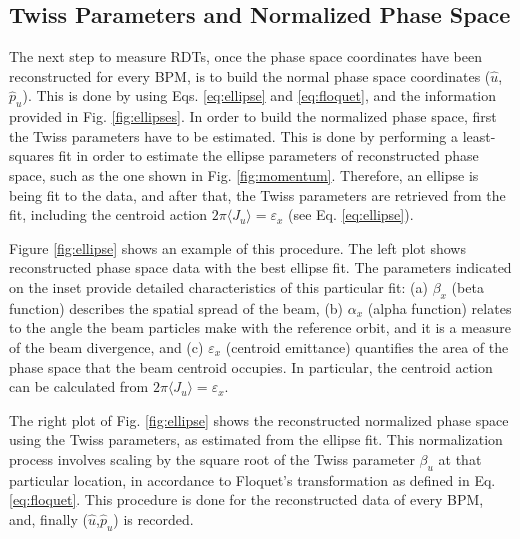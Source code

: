 \subsection{Twiss Parameters and Normalized Phase Space}

The next step to measure RDTs, once the phase space coordinates have been reconstructed for every BPM, is to build the normal phase space coordinates ($\hat{u}$,$\hat{p}_u$). This is done by using Eqs. \ref{eq:ellipse} and \ref{eq:floquet}, and the information provided in Fig. \ref{fig:ellipses}. In order to build the normalized phase space, first the Twiss parameters have to be estimated. This is done by performing a least-squares fit in order to estimate the ellipse parameters of reconstructed phase space, such as the one shown in Fig. \ref{fig:momentum}. Therefore, an ellipse is being fit to the data, and after that, the Twiss parameters are retrieved from the fit, including the centroid action $2 \pi \langle J_u \rangle =\varepsilon_x $ (see Eq. \ref{eq:ellipse}). 

Figure \ref{fig:ellipse} shows an example of this procedure. The left plot shows reconstructed phase space data with the best ellipse fit. The parameters indicated on the inset provide detailed characteristics of this particular fit: (a) $\beta_x$ (beta function) describes the spatial spread of the beam, (b) $\alpha_x$ (alpha function) relates to the angle the beam particles make with the reference orbit, and it is a measure of the beam divergence, and (c) $\varepsilon_x$ (centroid emittance) quantifies the area of the phase space that the beam centroid occupies. In particular, the centroid action can be calculated from $2 \pi \langle J_u \rangle =\varepsilon_x $.

The right plot of Fig. \ref{fig:ellipse} shows the reconstructed normalized phase space using the Twiss parameters, as estimated from the ellipse fit. This normalization process involves scaling by the square root of the Twiss parameter $\beta_u$ at that particular location, in accordance to Floquet's transformation as defined in Eq. \ref{eq:floquet}. This procedure is done for the reconstructed data of every BPM, and, finally ($\hat{u}$,$\hat{p}_u$) is recorded.  


